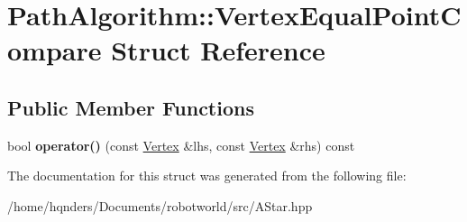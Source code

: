 \hypertarget{struct_path_algorithm_1_1_vertex_equal_point_compare}{}\section{Path\+Algorithm\+:\+:Vertex\+Equal\+Point\+Compare Struct Reference}
\label{struct_path_algorithm_1_1_vertex_equal_point_compare}
\subsection*{Public Member Functions}
\begin{DoxyCompactItemize}
\item 
bool {\bfseries operator()} (const \hyperlink{struct_path_algorithm_1_1_vertex}{Vertex} \&lhs, const \hyperlink{struct_path_algorithm_1_1_vertex}{Vertex} \&rhs) const \hypertarget{struct_path_algorithm_1_1_vertex_equal_point_compare_a3e17720ca1b633beb65c6f353145765d}{}\label{struct_path_algorithm_1_1_vertex_equal_point_compare_a3e17720ca1b633beb65c6f353145765d}

\end{DoxyCompactItemize}


The documentation for this struct was generated from the following file\+:\begin{DoxyCompactItemize}
\item 
/home/hqnders/\+Documents/robotworld/src/A\+Star.\+hpp\end{DoxyCompactItemize}
